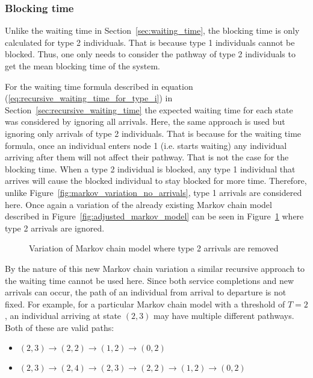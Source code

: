\subsubsection{Blocking time}

Unlike the waiting time in Section~\ref{sec:waiting_time}, 
the blocking time is only calculated for type 2 individuals.
That is because type 1 individuals cannot be blocked.
Thus, one only needs to consider the pathway of type 2 individuals to get the
mean blocking time of the system.

For the waiting time formula described in equation 
(\ref{eq:recursive_waiting_time_for_type_i}) in
Section~\ref{sec:recursive_waiting_time}
the expected waiting time for each state was considered by ignoring all
arrivals.
Here, the same approach is used but ignoring only arrivals of type 2
individuals.
That is because for the waiting time formula, once an individual enters
node 1 (i.e. starts waiting) any individual arriving after them will
not affect their pathway.
That is not the case for the blocking time.
When a type 2 individual is blocked, any type 1 individual that arrives will
cause the blocked individual to stay blocked for more time.
Therefore, unlike Figure~\ref{fig:markov_variation_no_arrivals}, type 1 arrivals
are considered here.
Once again a variation of the already existing Markov chain model described in
Figure~\ref{fig:adjusted_markov_model} can be seen in
Figure~\ref{fig:markov_variation_no_type_2_arrivals} where type 2 arrivals are
ignored.

\begin{figure}[ht]
    \centering
    
    \caption{Variation of Markov chain model where type 2 arrivals are removed}
    \label{fig:markov_variation_no_type_2_arrivals}
\end{figure}

By the nature of this new Markov chain variation a similar recursive approach
to the waiting time cannot be used here.
Since both service completions and new arrivals can occur, the path of an
individual from arrival to departure is not fixed.
For example, for a particular Markov chain model with a threshold of \(T=2\),
an individual arriving at state \((2, 3)\) may have multiple different pathways.
Both of these are valid paths:
\begin{itemize}
    \item \((2, 3) \rightarrow (2, 2) \rightarrow (1, 2) \rightarrow (0, 2)\)
    \item \((2, 3) \rightarrow (2, 4) \rightarrow (2, 3) \rightarrow (2, 2)
    \rightarrow (1, 2) \rightarrow (0, 2)\)
\end{itemize}

